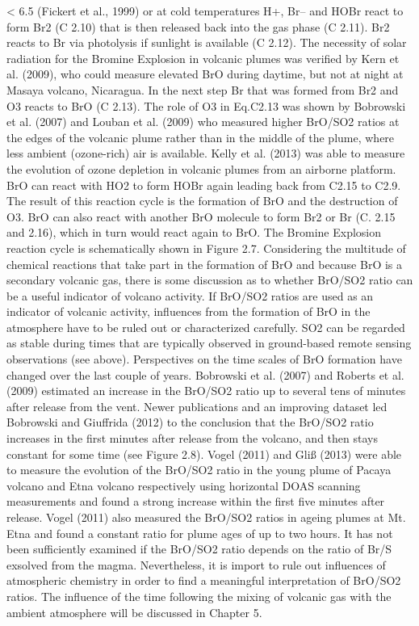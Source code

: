 \documentclass  [
  paper    = a4,
  BCOR     = 10mm,
  twoside,
  fontsize = 12pt,
  fleqn,
  toc      = bibnumbered,
  toc      = listofnumbered,
  numbers  = noendperiod,
  headings = normal,
  listof   = leveldown,
  version  = 3.03
]                                       {scrreprt}
\begin{document}
	< 6.5 (Fickert et al., 1999) or at cold temperatures H+, Br– and HOBr react to
	form Br2 (C 2.10) that is then released back into the gas phase (C 2.11). Br2
	reacts to Br via photolysis if sunlight is available (C 2.12). The necessity of solar
	radiation for the Bromine Explosion in volcanic plumes was verified by Kern et al.
	(2009), who could measure elevated BrO during daytime, but not at night at
	Masaya volcano, Nicaragua. In the next step Br that was formed from Br2 and
	O3 reacts to BrO (C 2.13). The role of O3 in Eq.C2.13 was shown by Bobrowski
	et al. (2007) and Louban et al. (2009) who measured higher BrO/SO2 ratios at
	the edges of the volcanic plume rather than in the middle of the plume, where
	less ambient (ozone-rich) air is available. Kelly et al. (2013) was able to measure
	the evolution of ozone depletion in volcanic plumes from an airborne platform.
	BrO can react with HO2 to form HOBr again leading back from C2.15 to C2.9.
	The result of this reaction cycle is the formation of BrO and the destruction of
	O3. BrO can also react with another BrO molecule to form Br2 or Br (C. 2.15
	and 2.16), which in turn would react again to BrO. The Bromine Explosion
	reaction cycle is schematically shown in Figure 2.7.
	Considering the multitude of chemical reactions that take part in the formation
	of BrO and because BrO is a secondary volcanic gas, there is some discussion as to
	whether BrO/SO2 ratio can be a useful indicator of volcano activity. If BrO/SO2 ratios are used as an indicator of volcanic activity, influences from the formation
	of BrO in the atmosphere have to be ruled out or characterized carefully. SO2 can
	be regarded as stable during times that are typically observed in ground-based
	remote sensing observations (see above). Perspectives on the time scales of BrO
	formation have changed over the last couple of years. Bobrowski et al. (2007)
	and Roberts et al. (2009) estimated an increase in the BrO/SO2 ratio up to
	several tens of minutes after release from the vent. Newer publications and an
	improving dataset led Bobrowski and Giuffrida (2012) to the conclusion that the
	BrO/SO2 ratio increases in the first minutes after release from the volcano, and
	then stays constant for some time (see Figure 2.8). Vogel (2011) and Gliß (2013)
	were able to measure the evolution of the BrO/SO2 ratio in the young plume of
	Pacaya volcano and Etna volcano respectively using horizontal DOAS scanning
	measurements and found a strong increase within the first five minutes after
	release. Vogel (2011) also measured the BrO/SO2 ratios in ageing plumes at Mt.
	Etna and found a constant ratio for plume ages of up to two hours. It has not
	been sufficiently examined if the BrO/SO2 ratio depends on the ratio of Br/S
	exsolved from the magma. Nevertheless, it is import to rule out influences of
	atmospheric chemistry in order to find a meaningful interpretation of BrO/SO2
	ratios. The influence of the time following the mixing of volcanic gas with the
	ambient atmosphere will be discussed in Chapter 5.
\end{document}
